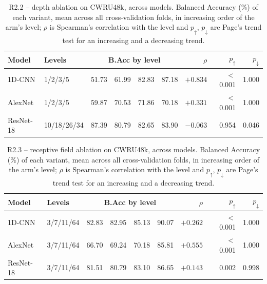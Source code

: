 \begin{table}[ht]
\centering
\caption{R2.2 -- depth ablation on CWRU48k, across models. Balanced Accuracy (\%) of each variant, mean across all cross-validation folds, in increasing order of the arm's level; $\rho$ is Spearman's correlation with the level and $p_\uparrow$, $p_\downarrow$ are Page's trend test for an increasing and a decreasing trend.}
\label{tab:ablation_summary_depth_cwru48k}
\begin{tabular}{@{}l l c c c c r r r@{}}
\toprule
\textbf{Model} & \textbf{Levels} & \multicolumn{4}{c}{\textbf{B.Acc by level}} & $\rho$ & $p_\uparrow$ & $p_\downarrow$ \\ \midrule
1D-CNN & 1/2/3/5 & 51.73 & 61.99 & 82.83 & 87.18 & $+0.834$ & $<$0.001 & 1.000 \\
AlexNet & 1/2/3/5 & 59.87 & 70.53 & 71.86 & 70.18 & $+0.331$ & $<$0.001 & 1.000 \\
ResNet-18 & 10/18/26/34 & 87.39 & 80.79 & 82.65 & 83.90 & $-0.063$ & 0.954 & 0.046 \\
\bottomrule
\end{tabular}
\end{table}

\begin{table}[ht]
\centering
\caption{R2.3 -- receptive field ablation on CWRU48k, across models. Balanced Accuracy (\%) of each variant, mean across all cross-validation folds, in increasing order of the arm's level; $\rho$ is Spearman's correlation with the level and $p_\uparrow$, $p_\downarrow$ are Page's trend test for an increasing and a decreasing trend.}
\label{tab:ablation_summary_kernel_cwru48k}
\begin{tabular}{@{}l l c c c c r r r@{}}
\toprule
\textbf{Model} & \textbf{Levels} & \multicolumn{4}{c}{\textbf{B.Acc by level}} & $\rho$ & $p_\uparrow$ & $p_\downarrow$ \\ \midrule
1D-CNN & 3/7/11/64 & 82.83 & 82.95 & 85.13 & 90.07 & $+0.262$ & $<$0.001 & 1.000 \\
AlexNet & 3/7/11/64 & 66.70 & 69.24 & 70.18 & 85.81 & $+0.555$ & $<$0.001 & 1.000 \\
ResNet-18 & 3/7/11/64 & 81.51 & 80.79 & 83.10 & 86.65 & $+0.143$ & 0.002 & 0.998 \\
\bottomrule
\end{tabular}
\end{table}

